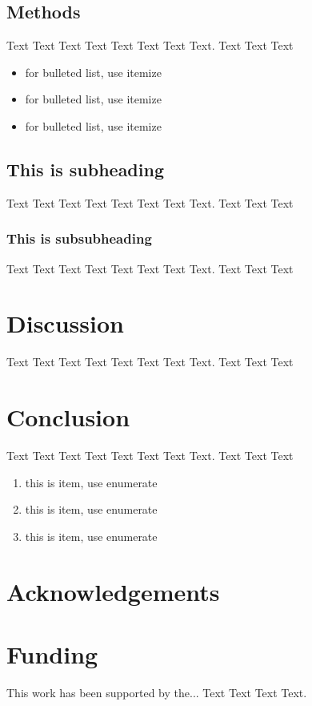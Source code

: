 \documentclass{bioinfo}
\begin{document}
\begin{methods}
\section{Methods}
Text Text Text Text Text Text  Text Text.  Text Text Text


\begin{itemize}
\item for bulleted list, use itemize
\item for bulleted list, use itemize
\item for bulleted list, use itemize\vspace*{1pt}
\end{itemize}

\subsection{This is subheading}
Text Text Text Text Text Text  Text Text.  Text Text Text

\subsubsection{This is subsubheading}
Text Text Text Text Text Text  Text Text.  Text Text Text


\end{methods}


\section{Discussion}
Text Text Text Text Text Text  Text Text.  Text Text Text 

\section{Conclusion}
Text Text Text Text Text Text  Text Text.  Text Text Text

\begin{enumerate}
\item this is item, use enumerate
\item this is item, use enumerate
\item this is item, use enumerate
\end{enumerate}

\section*{Acknowledgements}


\section*{Funding}

This work has been supported by the... Text Text  Text Text.\vspace*{-12pt}
\end{document}
